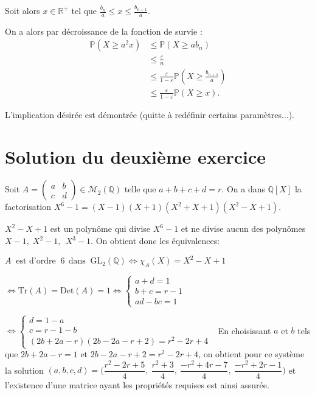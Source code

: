 Soit alors $x\in\mathbb{R}^{+}$ tel que $\displaystyle \frac{b_{n}}{a}\leq x\leq \frac{b_{n+1}}{a}.$

On a alors par décroissance de la fonction de survie :
\begin{align*}
\mathbb{P}(X\geq a^{2}x) & \leq \mathbb{P}(X\geq ab_{n})\\
& \leq \frac{\varepsilon}{n}\\
& \leq \frac{\varepsilon}{1-\varepsilon}\mathbb{P}(X\geq \frac{b_{n+1}}{a})\\
& \leq \frac{\varepsilon}{1-\varepsilon}\mathbb{P}(X\geq x).
\end{align*}

L'implication désirée est démontrée (quitte à redéfinir certains paramètres...).
\section {Solution du deuxième exercice}%
Soit $A = \begin{pmatrix} a&b\\c&d \end{pmatrix} \in \mathcal M_2(\mathbb Q) $  telle que $a+b+c+d = r.$ On a dans $\mathbb Q[X]$ la factorisation $X^6-1 =(X-1)(X+1)(X^2+X+1)(X^2-X+1).$

$X^2-X +1$ est un polynôme qui divise $X^6-1$ et ne divise aucun des polynômes $X-1,\;X^2-1,\:\:X^3-1.$ On  obtient  donc les équivalences:
 
$A\:\text{  est d'ordre }\:6 \:\: \text {dans }\:\mathrm{GL}_2 (\mathbb Q)   \iff  \chi _A (X) = X^2-X+1$ 

$\iff \text{Tr}(A) = \text{Det}(A) =1  \iff \left\{ \begin {array} {l} a+d = 1\\b+c = r-1 \\ ad -bc =1 \end{array} \right.$

$ \iff \left\{ \begin{array} {l} d=1-a\\ c= r-1-b\\ (2b+2a-r)(2b-2a -r+2) = r^2-2r +4 \end{array} \right.\:\:$ 
En choisissant $a$ et $b$ tels que $2b+2a-r =1$ et $2b-2a -r+2 = r^2-2r+4$, on obtient pour ce système la solution
 $(a,b,c,d) =\Big( \dfrac{r^2-2r+5}4 ,\: \dfrac {r^2+3}4,\: \dfrac{-r^2+4r-7}4,\:\dfrac {-r^2+2r-1}4 \Big)$  et l'existence d'une matrice ayant les propriétés requises est ainsi assurée.
